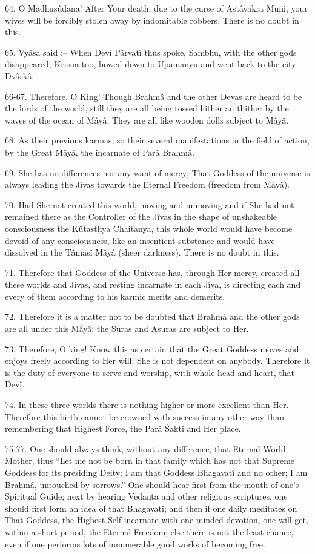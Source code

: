 64. O Madhusûdana! After Your death, due to the curse of Ast\^avakra Muni, your wives will be forcibly stolen away by indomitable robbers. There is no doubt in this.

65. Vy\^asa said :-- When Dev\^i P\^arvat\^i thus spoke, \'Sambhu, with the other gods disappeared; Krisna too, bowed down to Upamanyu and went back to the city Dv\^ark\^a.

66-67. Therefore, O King! Though Brahm\^a  and the other Devas are heard to be the lords of the world, still they are all being tossed hither an thither by the waves of the ocean of M\^ay\^a. They are all like wooden dolls subject to M\^ay\^a.

68. As their previous karmas, so their several manifestations in the field of action, by the Great M\^ay\^a, the incarnate of Par\^a Brahm\^a.

69. She has no differences nor any want of mercy; That Goddess of the universe is always leading the J\^ivas towards the Eternal Freedom (freedom from M\^ay\^a).

70. Had She not created this world, moving and unmoving and if She had not remained there as the Controller of the J\^ivas in the shape of unshakeable consciousness the Kûtasthya Chaitanya, this whole world would have become devoid of any consciousness, like an insentient substance and would have dissolved in the T\^amas\^i M\^ay\^a (sheer darkness). There is no doubt in this.

71. Therefore that Goddess of the Universe has, through Her mercy, created all these worlds and J\^ivas, and resting incarnate in each J\^iva, is directing each and every of them according to his karmic merits and demerits.

72. Therefore it is a matter not to be doubted that Brahm\^a  and the other gods are all under this M\^ay\^a; the Suras and Asuras are subject to Her.

73. Therefore, O king! Know this as certain that the Great Goddess moves and enjoys freely according to Her will; She is not dependent on anybody. Therefore it is the duty of everyone to serve and worship, with whole head and heart, that Dev\^i.

74. In these three worlds there is nothing higher or more excellent than Her. Therefore this birth cannot be crowned with success in any other way than remembering that Highest Force, the Par\^a \'Sakti and Her place.

75-77. One should always think, without any difference, that Eternal World Mother, thus ``Let me not be born in that family which has not that Supreme Goddess for its presiding Deity; I am that Goddess Bhagavat\^i and no other; I am Brahm\^a, untouched by sorrows.'' One should hear first from the mouth of one's Spiritual Guide; next by hearing Vedanta and other religious scriptures, one should first form an idea of that Bhagavat\^i; and then if one daily meditates on That Goddess, the Highest Self incarnate with one minded devotion, one will get, within a short period, the Eternal Freedom; else there is not the least chance, even if one performs lots of innumerable good works of becoming free.

